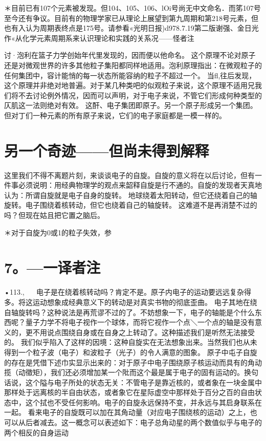 ＊目前已有107个元素被发现。但104、105、106、lOi号尚无中文命名．而笫107号至今还有争议。目前有的物理学家已从理论上展望到第九周期和第218号元素，但也有入认为周期表终点是175号。请参看«光明日报)d978.7.19第二版谢强、金日光作«从化学元素周期系来认识理论和实践的关系况——怪者注

讨·泡利在篮子力学创始年代里发现的，因而便以他命名。
这个原理不论对原子还是对微观世界的许多其他粒子集阳都同样地适用。泡利原理指出：在微观粒子的任何集团中，容计能悄的每一状态所能容纳的粒子不超过一个。
当fl,往后发现，这个原理并非绝对地普遍。对于某几种类吧的似观粒子来说，这个原理不适用兄我们将不去讨论例外情况，因而可以声明，对于电子来说，不管它们形成何种类型的仄肌这一法则绝对有效。
这酐、电子集团即原子。另一个原子形成另一个集团。
但对丁们一种元素的所有原子来说，它们的电子家庭都是一模一样的。

\section{另一个奇迹——但尚未得到解释}

这里我们不得不离题片刻，来谈谈电子的自旋。自旋的意义将在以后讨论，但有一件事必须说明：用经典物理学的观点来韶释自旋是行不通的。自旋的发现者天真地认为：所谓自旋就是电子自身的旋转。
地球绕着太阳转动，但它还绕着自己的轴旋转。电子围绕着核转动，但它也绕着自己的轴旋转。
这难道不是再消楚不过的吗？但现在姑且把它置之脑后。

＊对于自旋为0或1的粒子失效，参\section{7。—一译者注}

•113.,
  
电子是在绕着核转动吗？肯定不是。原子内电子的运动要远远复杂得多。将这运动想象成经典意义下的转动是对真实书物的彻底歪曲。
电子其地在绕自轴旋转吗？这种说法是再荒谬不过的了。不妨想象一下，电子的轴能是个什么东西呢？量子力学不将电子视作一个球体，而将它视作一个点＼一个点的轴是没有意义的，更不用说点围绕自身或在自身之上转动了。这种描述我们是听然无法接受的。
我们似乎陷入了这样的因境：这种自旋实在无法想象出来。当然我们也从未得到一个粒子波（电子）和波粒子（光子）的令人满意的图象。
原子中屯子自旋的存在是凭借下述巾实显示出来的：对于原子中电子围绕原子核运动而具有的角动揽（动徵矩），我们还必须增加某一个阰而这个最是属于电子的固有运动的。换句话说，这个隘与电子所处的状态无关：不管电子是靠近核的，或者象在一块金属中那样处于远离核的半自由状态，或者象它在星际虚空中那样处于百分之百的自由状态中，这个拭也不受任何影响。电子的自旋永远保持不变，并永远与其启身联系在一起。
看来电子的自旋既可以加在其角动量（对应电子围绕核的运动）之上，也可以从后者减去。这一概念可以表述如下：电子总角动星的两个数值似乎与电子的两个相反的自身运动

